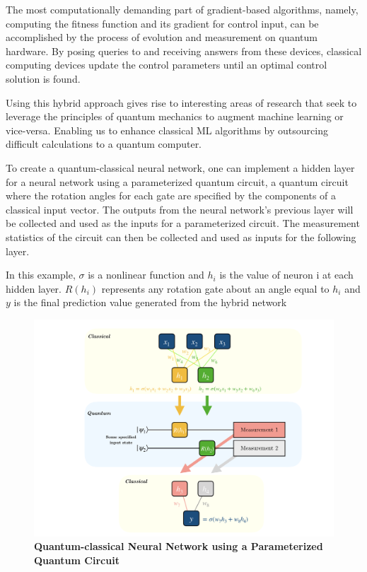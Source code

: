 \documentclass{scrartcl}
\begin{document}
The most computationally demanding part of gradient-based algorithms, namely, computing the fitness function and its gradient for control input, can be accomplished by the process of evolution and measurement on quantum hardware. By posing queries to and receiving answers from these devices, classical computing devices update the control parameters until an optimal control solution is found.

Using this hybrid approach gives rise to interesting areas of research that seek to leverage the principles of quantum mechanics to augment machine learning or vice-versa. Enabling us to enhance classical ML algorithms by outsourcing difficult calculations to a quantum computer.

To create a quantum-classical neural network, one can implement a hidden layer for a neural network using a parameterized quantum circuit, a quantum circuit where the rotation angles for each gate are specified by the components of a classical input vector. The outputs from the neural network's previous layer will be collected and used as the inputs for a parameterized circuit. The measurement statistics of the circuit can then be collected and used as inputs for the following layer.

In this example, \(\sigma\) is a nonlinear function and \(h_{i}\) is the value of neuron i at each hidden layer. \(R(h_{i})\) represents any rotation gate about an angle equal to \(h_{i}\) and \(y\) is the final prediction value generated from the hybrid network

\begin{figure}[htbp]
\centering
\includegraphics[width=.9\linewidth]{./assets/neuralnetworkQC.png}
\caption{\textbf{Quantum-classical Neural Network using a Parameterized Quantum Circuit}}
\end{figure}
\end{document}
